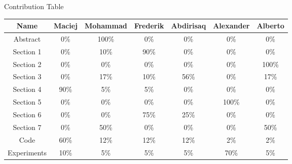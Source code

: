 
\Huge
Contribution Table
\vspace{0.5cm}

\begin{adjustbox}{width=\columnwidth}
    \begin{tabular}{||c c c c c c c||} 
         \hline
         Name & Maciej & Mohammad & Frederik & Abdirisaq & Alexander & Alberto \\ [0.4ex] 
         \hline\hline
         Abstract & 0\% & 100\%  & 0\%  & 0\%  & 0\%  & 0\% \\
         \hline
         Section 1 & 0\% & 10\%  & 90\%  & 0\%  & 0\%  & 0\% \\ 
         \hline
         Section 2 & 0\% & 0\%  & 0\%  & 0\%  & 0\%  & 100\% \\
         \hline
         Section 3 & 0\% & 17\%  & 10\%  & 56\%  & 0\%  & 17\% \\
         \hline
         Section 4 & 90\% & 5\%  & 5\%  & 0\%  & 0\%  & 0\% \\
         \hline
         Section 5 & 0\% & 0\%  & 0\%  & 0\%  & 100\%  & 0\% \\
         \hline
         Section 6 & 0\% & 0\%  & 75\%  & 25\%  & 0\%  & 0\% \\
         \hline
         Section 7 & 0\% & 50\%  & 0\%  & 0\%  & 0\%  & 50\% \\
        \hline
         Code & 60\% & 12\%  & 12\%  & 12\%  & 2\%  & 2\% \\
         \hline
         Experiments & 10\% & 5\%  & 5\%  & 5\%  & 70\%  & 5\% \\
        \hline
    \end{tabular}
\end{adjustbox}